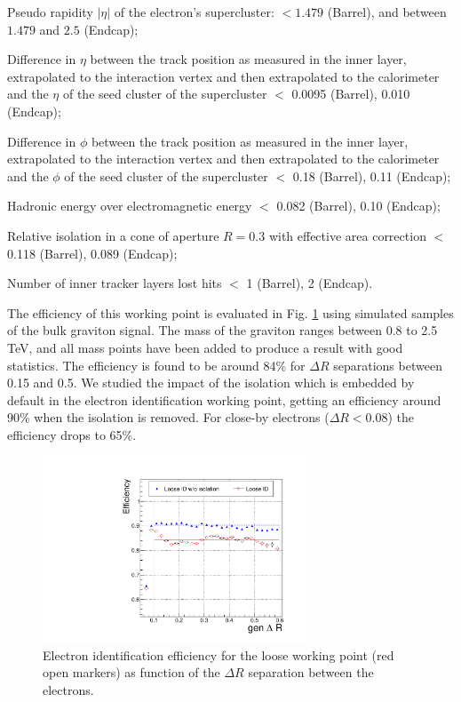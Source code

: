 \begin{compact_itemize}
\item Pseudo rapidity $|\eta|$ of the electron's supercluster: $ < 1.479$ (Barrel), and between $1.479$ and $2.5$ (Endcap);
\item Difference in $\eta$ between the track position as measured in the inner layer, extrapolated to the interaction vertex and then extrapolated to the calorimeter and the $\eta$ of the seed cluster of the supercluster $<$ 0.0095 (Barrel), 0.010 (Endcap);
\item Difference in $\phi$ between the track position as measured in the inner layer, extrapolated to the interaction vertex and then extrapolated to the calorimeter and the $\phi$ of the seed cluster of the supercluster $<$ 0.18 (Barrel), 0.11 (Endcap);
\item Hadronic energy over electromagnetic energy $<$ 0.082 (Barrel), 0.10 (Endcap);
\item Relative isolation in a cone of aperture $R=0.3$ with effective area correction $<$ 0.118 (Barrel), 0.089 (Endcap);
\item Number of inner tracker layers lost hits $<$ 1 (Barrel), 2 (Endcap).
\end{compact_itemize}

The efficiency of this working point is evaluated in Fig. \ref{fig:eleid} using simulated samples of the bulk graviton signal. The mass of the graviton ranges between 0.8 to 2.5 TeV, and all mass points have been added to produce a result with good statistics. The efficiency is found to be around 84\% for $\Delta R$ separations between 0.15 and 0.5. We studied the impact of the isolation which is embedded by default in the electron identification working point, getting an efficiency around 90\% when the isolation is removed. For close-by electrons ($\Delta R < 0.08$) the efficiency drops to 65\%.

\begin{figure}[htb]
\centering
\includegraphics[width=0.7\textwidth]{figures/objects/id-eff-dR-ele.pdf}
\caption[Electron identification efficiency]{Electron identification efficiency for the loose working point (red open markers) as function of the $\Delta R$ separation between the electrons.} %
\label{fig:eleid}
\end{figure}

